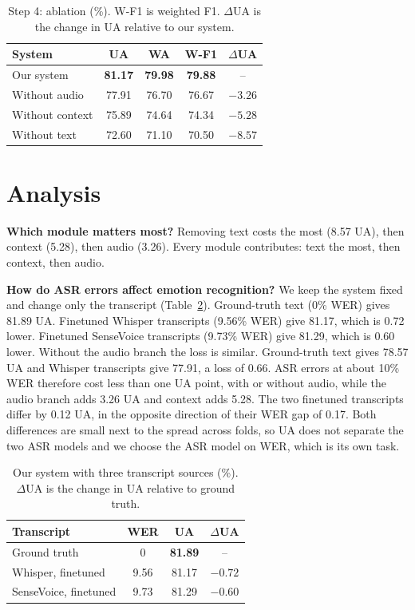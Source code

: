 \documentclass[conference]{IEEEtran}
\newcommand{\tabstyle}{\footnotesize\setlength{\tabcolsep}{3.5pt}}
\begin{document}
\begin{table}[!t]
\centering
\caption{Step 4: ablation (\%). W-F1 is weighted F1. $\Delta$UA is the change in UA relative to our system.}
\label{tab:abl}
\tabstyle
\begin{tabular}{lcccc}
\toprule
System & UA & WA & W-F1 & $\Delta$UA \\
\midrule
Our system & \textbf{81.17} & \textbf{79.98} & \textbf{79.88} & -- \\
Without audio & 77.91 & 76.70 & 76.67 & $-3.26$ \\
Without context & 75.89 & 74.64 & 74.34 & $-5.28$ \\
Without text & 72.60 & 71.10 & 70.50 & $-8.57$ \\
\bottomrule
\end{tabular}
\end{table}

\section{Analysis}

\textbf{Which module matters most?} Removing text costs the most (8.57 UA), then context (5.28), then audio (3.26). Every module contributes: text the most, then context, then audio.

\textbf{How do ASR errors affect emotion recognition?} We keep the system fixed and change only the transcript
(Table~\ref{tab:gt}). Ground-truth text (0\% WER) gives 81.89 UA. Finetuned Whisper transcripts (9.56\% WER) give
81.17, which is 0.72 lower. Finetuned SenseVoice transcripts (9.73\% WER) give 81.29, which is 0.60 lower. Without
the audio branch the loss is similar. Ground-truth text gives 78.57 UA and Whisper transcripts give 77.91, a loss of
0.66. ASR errors at about 10\% WER therefore cost less than one UA point, with or without audio, while the audio branch
adds 3.26 UA and context adds 5.28. The two finetuned transcripts differ by 0.12 UA, in the opposite direction of their
WER gap of 0.17. Both differences are small next to the spread across folds, so UA does not separate the two ASR models
and we choose the ASR model on WER, which is its own task.

\begin{table}[!t]
\centering
\caption{Our system with three transcript sources (\%). $\Delta$UA is the change in UA relative to ground truth.}
\label{tab:gt}
\tabstyle
\begin{tabular}{lccc}
\toprule
Transcript & WER & UA & $\Delta$UA \\
\midrule
Ground truth & 0 & \textbf{81.89} & -- \\
Whisper, finetuned & 9.56 & 81.17 & $-0.72$ \\
SenseVoice, finetuned & 9.73 & 81.29 & $-0.60$ \\
\bottomrule
\end{tabular}
\end{table}
\end{document}
